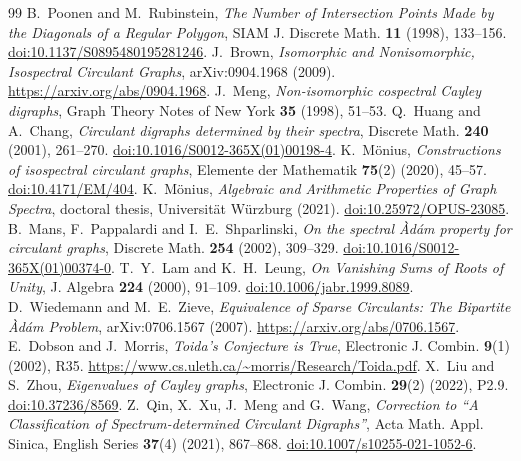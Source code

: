 \documentclass[11pt]{article}
\theoremstyle{remark}\newtheorem{remark}[theorem]{Remark}
\begin{document}
\begin{thebibliography}{99}
 B.~Poonen and M.~Rubinstein, \emph{The Number of Intersection Points Made by the Diagonals of a Regular Polygon}, SIAM J. Discrete Math. \textbf{11} (1998), 133--156. \href{https://doi.org/10.1137/S0895480195281246}{doi:10.1137/S0895480195281246}.
 J.~Brown, \emph{Isomorphic and Nonisomorphic, Isospectral Circulant Graphs}, arXiv:0904.1968 (2009). \url{https://arxiv.org/abs/0904.1968}.
 J.~Meng, \emph{Non-isomorphic cospectral Cayley digraphs}, Graph Theory Notes of New York \textbf{35} (1998), 51--53.
 Q.~Huang and A.~Chang, \emph{Circulant digraphs determined by their spectra}, Discrete Math. \textbf{240} (2001), 261--270. \href{https://doi.org/10.1016/S0012-365X(01)00198-4}{doi:10.1016/S0012-365X(01)00198-4}.
 K.~M\"onius, \emph{Constructions of isospectral circulant graphs}, Elemente der Mathematik \textbf{75}(2) (2020), 45--57. \href{https://doi.org/10.4171/EM/404}{doi:10.4171/EM/404}.
 K.~M\"onius, \emph{Algebraic and Arithmetic Properties of Graph Spectra}, doctoral thesis, Universit\"at W\"urzburg (2021). \href{https://doi.org/10.25972/OPUS-23085}{doi:10.25972/OPUS-23085}.
 B.~Mans, F.~Pappalardi and I.~E.~Shparlinski, \emph{On the spectral \`Ad\'am property for circulant graphs}, Discrete Math. \textbf{254} (2002), 309--329. \href{https://doi.org/10.1016/S0012-365X(01)00374-0}{doi:10.1016/S0012-365X(01)00374-0}.
 T.~Y.~Lam and K.~H.~Leung, \emph{On Vanishing Sums of Roots of Unity}, J. Algebra \textbf{224} (2000), 91--109. \href{https://doi.org/10.1006/jabr.1999.8089}{doi:10.1006/jabr.1999.8089}.
 D.~Wiedemann and M.~E.~Zieve, \emph{Equivalence of Sparse Circulants: The Bipartite \`Ad\'am Problem}, arXiv:0706.1567 (2007). \url{https://arxiv.org/abs/0706.1567}.
 E.~Dobson and J.~Morris, \emph{Toida's Conjecture is True}, Electronic J. Combin. \textbf{9}(1) (2002), R35. \url{https://www.cs.uleth.ca/~morris/Research/Toida.pdf}.
 X.~Liu and S.~Zhou, \emph{Eigenvalues of Cayley graphs}, Electronic J. Combin. \textbf{29}(2) (2022), P2.9. \href{https://doi.org/10.37236/8569}{doi:10.37236/8569}.
 Z.~Qin, X.~Xu, J.~Meng and G.~Wang, \emph{Correction to ``A Classification of Spectrum-determined Circulant Digraphs''}, Acta Math. Appl. Sinica, English Series \textbf{37}(4) (2021), 867--868. \href{https://doi.org/10.1007/s10255-021-1052-6}{doi:10.1007/s10255-021-1052-6}.
\end{thebibliography}
\end{document}

